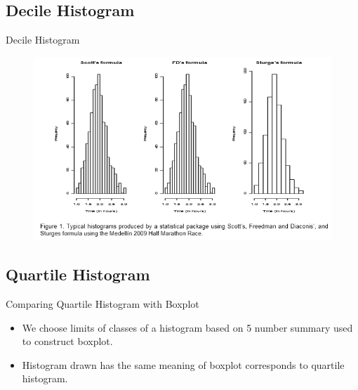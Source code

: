 \documentclass{beamer}
\begin{document}
\subsection{Decile Histogram}
\begin{frame}{Decile Histogram}

	\begin{figure}[t]
		\centering
       		\includegraphics[scale=0.65]{figure1}
 
	\end{figure}

\end{frame}


\subsection{Quartile Histogram}
\begin{frame}{Comparing Quartile Histogram with Boxplot}

	\begin{itemize}
		\item We choose limits of classes of a histogram based on 5 number summary used to construct boxplot.
		\item Histogram drawn has the same meaning of boxplot corresponds to quartile histogram.
		
	\end{itemize}

\end{frame}
\end{document}
